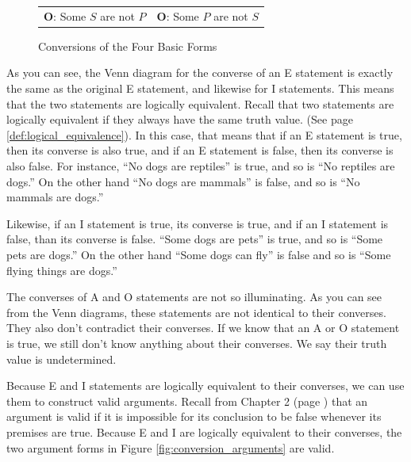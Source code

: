 \begin{figure}
\begin{mdframed}[style=mytablebox]
\begin{tabu}{p{.5\linewidth}p{.5\linewidth}}
\\

\textbf{O}: Some $S$ are not $P$

&

\textbf{O}: Some $P$ are not $S$

\end{tabu}
\end{mdframed}
\caption{Conversions of the Four Basic Forms}
\label{fig:conversion} 	
\end{figure}

As you can see, the Venn diagram for the converse of an E statement is exactly the same as the original E statement, and likewise for I statements. This means that the two statements are logically equivalent. Recall that two statements are logically equivalent if they always have the same truth value. (See page \ref{def:logical_equivalence}). In this case, that means that if an E statement is true, then its converse is also true, and if an E statement is false, then its converse is also false. For instance, ``No dogs are reptiles'' is true, and so is ``No reptiles are dogs.'' On the other hand ``No dogs are mammals'' is false, and so is ``No mammals are dogs.''

Likewise, if an I statement is true, its converse is true, and if an I statement is false, than its converse is false. ``Some dogs are pets'' is true, and so is ``Some pets are dogs.'' On the other hand ``Some dogs can fly'' is false and so is ``Some flying things are dogs.''

The converses of A and O statements are not so illuminating. As you can see from the Venn diagrams, these statements are not identical to their converses. They also don't contradict their converses. If we know that an A or O statement is true, we still don't know anything about their converses. We say their truth value is undetermined. 

Because E and I statements are logically equivalent to their converses, we can use them to construct valid arguments. Recall from Chapter 2 (page \pageref{def:valid}) that an argument is valid if it is impossible for its conclusion to be false whenever its premises are true. Because E and I are logically equivalent to their converses, the two argument forms in Figure \ref{fig:conversion_arguments} are valid. 


